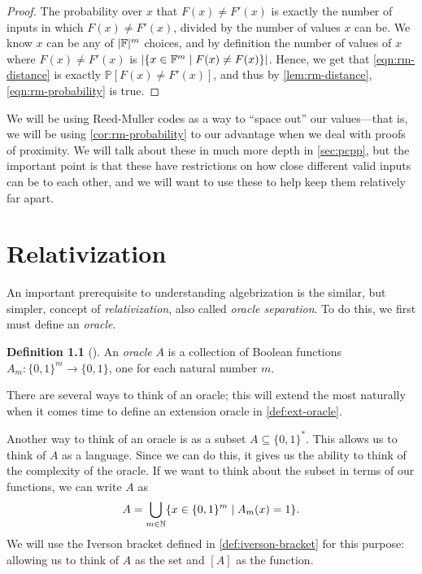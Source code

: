 \documentclass[english,12pt]{reedthesis}
\theoremstyle{plain}
\theoremstyle{definition}
\newtheorem{defn}[defn]{Definition}
\theoremstyle{remark}
\DeclarePairedDelimiter{\abs}{\lvert}{\rvert}
\begin{document}
\begin{proof}
  The probability over $x$ that $F(x) \ne F'(x)$ is exactly the number of inputs
  in which $F(x) \ne F'(x)$, divided by the number of values $x$ can be. We know
  $x$ can be any of $\abs{\mathbb{F}}^{m}$ choices, and by definition the number
  of values of $x$ where $F(x) \ne F'(x)$ is
  $\abs{\{x \in \mathbb{F}^{m} \mid F(x) \ne F(x)\}}$. Hence, we get that
  \cref{eqn:rm-distance} is exactly $\mathbb{P}[F(x) \ne F'(x)]$, and thus by
  \cref{lem:rm-distance}, \cref{eqn:rm-probability} is true.
\end{proof}

We will be using Reed-Muller codes as a way to ``space out'' our values---that is,
we will be using \cref{cor:rm-probability} to our advantage when we deal with
proofs of proximity. We will talk about these in much more depth in
\cref{sec:pcpp}, but the important point is that these have restrictions on how
close different valid inputs can be to each other, and we will want to use these
to help keep them relatively far apart.

\chapter{Relativization}

An important prerequisite to understanding algebrization is the similar, but
simpler, concept of \emph{relativization}, also called \emph{oracle separation}.
To do this, we first must define an \emph{oracle}.
\begin{defn}[{\cite[Def.\ 2.1]{AW09}}]\label{def:oracle}
  An \emph{oracle} $A$ is a collection of Boolean functions
  $A_{m}\colon \{0, 1\}^{m} \rightarrow \{0, 1\}$, one for each natural number $m$.
\end{defn}
There are several ways to think of an oracle; this will extend the most
naturally when it comes time to define an extension oracle in
\cref{def:ext-oracle}.

Another way to think of an oracle is as a subset $A \subseteq \{0, 1\}^{*}$. This allows
us to think of $A$ as a language. Since we can do this, it gives us the ability
to think of the complexity of the oracle. If we want to think about the subset
in terms of our functions, we can write $A$ as
\begin{equation}
  A = \bigcup_{m \in \mathbb{N}}\mleft\{x \in \{0, 1\}^{m} \mid A_{m}(x) = 1\mright\}.
\end{equation}
We will use the Iverson bracket defined in \cref{def:iverson-bracket} for this
purpose: allowing us to think of $A$ as the set and $[A]$ as the function.
\end{document}
